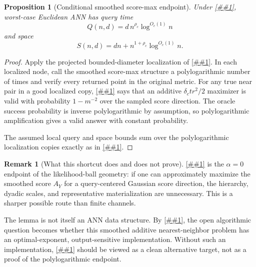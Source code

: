 \documentclass[10pt]{article}
\newcommand{\cref}[1]{\ref{##1}}
\newcommand{\Cref}[1]{\ref{##1}}
\newtheorem{proposition}[theorem]{Proposition}
\theoremstyle{definition}
\newtheorem{remark}[theorem]{Remark}
\begin{document}
\begin{proposition}[Conditional smoothed score-max endpoint]\label{prop:smoothed-score-max-polylog}
   Under \cref{asm:smoothed-score-max}, worst-case Euclidean ANN has query time
   \[
      Q(n,d)=d\,n^{\rho_c}\log^{O_c(1)}n
   \]
   and space
   \[
      S(n,d)=dn+n^{1+\rho_c}\log^{O_c(1)}n.
   \]
\end{proposition}

\begin{proof}
   Apply the projected bounded-diameter localization of \cref{lem:localization}.
   In each localized node, call the smoothed score-max structure a
   polylogarithmic number of times and verify every returned point in the
   original metric. For any true near pair in a good localized copy,
   \cref{lem:smoothed-max-score-margin} says that an additive
   $\delta_c t r^2/2$ maximizer is valid with probability $1-m^{-2}$ over the
   sampled score direction. The oracle success probability is inverse
   polylogarithmic by assumption, so polylogarithmic amplification gives a
   valid answer with constant probability.

   The assumed local query and space bounds sum over the polylogarithmic
   localization copies exactly as in \cref{prop:multiscale-structured-polylog}.
\end{proof}

\begin{remark}[What this shortcut does and does not prove]\label{rem:score-max-shortcut}
   \Cref{lem:smoothed-max-score-margin} is the $\alpha=0$ endpoint of the
   likelihood-ball geometry: if one can approximately maximize the smoothed
   score $A_Y$ for a query-centered Gaussian score direction, the hierarchy,
   dyadic scales, and representative materialization are unnecessary. This is
   a sharper possible route than finite channels.

   The lemma is not itself an ANN data structure. By
   \cref{lem:score-max-additive-nn}, the open algorithmic question becomes
   whether this smoothed additive nearest-neighbor problem has an
   optimal-exponent, output-sensitive implementation. Without such an
   implementation, \cref{asm:smoothed-score-max} should be viewed as a clean
   alternative target, not as a proof of the polylogarithmic endpoint.
\end{remark}
\end{document}
